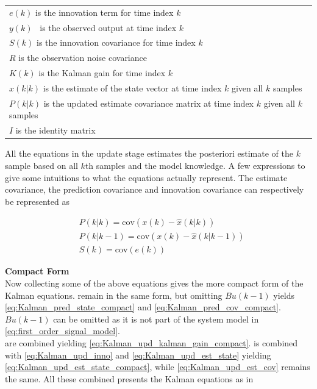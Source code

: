 \begin{center}
	\begin{tabular}{l}
		$ e(k) $ is the innovation term for time index $ k  $	\\
		$ 	y(k) $ \ is the observed output at time index $ k $	\\
		$ S(k) $ is the innovation covariance for time index  $ k $	\\
		$ R $ is the observation noise covariance	\\
		$ K(k) $ is the Kalman gain for time index 	$ k $	\\
		$ \hat{x}(k|k) $ is the estimate of the state vector at time index $ k $  given all $ k $ samples	\\
		$ P(k|k)$  is the updated estimate covariance matrix at time index $ k $ given all $ k $ samples	\\
		$ I  $ is the identity matrix
	\end{tabular}
\end{center}

All the equations in the update stage estimates the posteriori estimate of the $ k $ sample based on all $ k $th samples and the model knowledge. A few expressions to give some intuitions to what the equations actually represent. The estimate covariance, the prediction covariance and innovation covariance can respectively be represented as 

\begin{align}
	&{P}(k|k) 	= \text{cov}({x}(k)-	\hat{{x}}(k|k))	\\
	&{P}(k|k-1) 	= \text{cov}({x}(k)-	\hat{{x}}(k|k-1)) 		\\
	&{S}(k) 		= \text{cov}({e}(k)) 
\end{align}

\textbf{Compact Form}\\
Now collecting some of the above equations gives the more compact form of the Kalman equations.
 remain in the same form, but omitting $ {Bu}(k-1) $ yields \cref{eq:Kalman_pred_state_compact} and \cref{eq:Kalman_pred_cov_compact}. $ {Bu}(k-1) $ can be omitted as it is not part of the system model in \cref{eq:first_order_signal_model}.\\
 are combined yielding \cref{eq:Kalman_upd_kalman_gain_compact}.  is combined with \cref{eq:Kalman_upd_inno} and \cref{eq:Kalman_upd_est_state} yielding \cref{eq:Kalman_upd_est_state_compact}, while \cref{eq:Kalman_upd_est_cov} remains the same. All these combined presents the Kalman equations as in \cite{Bozic1994}\\

